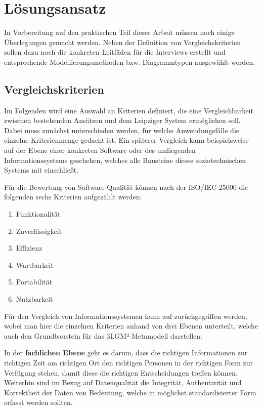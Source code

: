 \chapter{Lösungsansatz}\label{ch:approach}

In Vorbereitung auf den praktischen Teil dieser Arbeit müssen noch einige Überlegungen gemacht werden. Neben der Definition von Vergleichskriterien sollen dazu noch die konkreten Leitfäden für die Interviews erstellt und entsprechende Modellierungsmethoden bzw. Diagrammtypen ausgewählt werden.

\section{Vergleichskriterien}

Im Folgenden wird eine Auswahl an Kriterien definiert, die eine Vergleichbarkeit zwischen bestehenden Ansätzen und dem Leipziger System ermöglichen soll. Dabei muss zunächst unterschieden werden, für welche Anwendungsfälle die einzelne Kriterienmenge gedacht ist. Ein späterer Vergleich kann beispielsweise auf der Ebene einer konkreten Software oder des umliegenden Informationssystems geschehen, welches alle Bausteine dieses soziotechnischen Systems mit einschließt.

Für die Bewertung von Software-Qualität können nach der ISO/IEC 25000 die folgenden sechs Kriterien aufgezählt werden:

\begin{enumerate}
	\item Funktionalität
	\item Zuverlässigkeit
	\item Effizienz
	\item Wartbarkeit
	\item Portabilität
	\item Nutzbarkeit
\end{enumerate}


Für den Vergleich von Informationssystemen kann auf \citet{Winter.2023} zurückgegriffen werden, wobei man hier die einzelnen Kriterien anhand von drei Ebenen unterteilt, welche auch den Grundbaustein für das 3LGM²-Metamodell darstellen:

In der \textbf{fachlichen Ebene} geht es darum, dass die richtigen Informationen zur richtigen Zeit am richtigen Ort den richtigen Personen in der richtigen Form zur Verfügung stehen, damit diese die richtigen Entscheidungen treffen können. Weiterhin sind im Bezug auf Datenqualität die Integrität, Authentizität und Korrektheit der Daten von Bedeutung, welche in möglichst standardisierter Form erfasst werden sollten.

